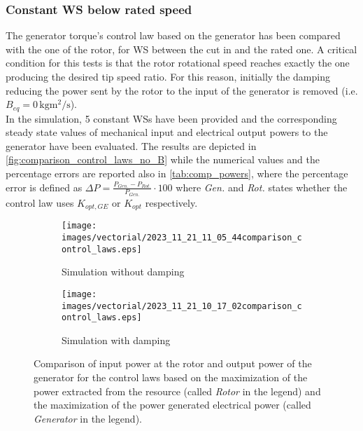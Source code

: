 \subsubsection{Constant WS below rated speed}
The generator torque's control law based on the generator has been compared with the one of the rotor, for WS between the cut in and the rated one. A critical condition for this tests is that the rotor rotational speed reaches exactly the one producing the desired tip speed ratio. For this reason, initially the damping reducing the power sent by the rotor to the input of the generator is removed (i.e. $B_{eq}=0 \, \si{\kilo\gram\square\meter\per\second}$). \\
In the simulation, 5 constant WSs have been provided and the corresponding steady state values of mechanical input and electrical output powers to the generator have been evaluated. The results are depicted in \autoref{fig:comparison_control_laws_no_B} while the numerical values and the percentage errors are reported also in \autoref{tab:comp_powers}, where the percentage error is defined as $\Delta P = \frac{P_{Gen.} - P_{Rot.}}{P_{Gen.}}\cdot 100$ where  \textit{Gen.} and \textit{Rot.} states whether the control law uses $K_{opt,GE}$ or $K_{opt}$ respectively.

\begin{figure}[htb]
  \centering
  \begin{subfigure}{\columnwidth}
    \texttt{[image: images/vectorial/2023\_11\_21\_11\_05\_44comparison\_control\_laws.eps]}
    \caption{Simulation without damping}
    \label{fig:comparison_control_laws_no_B}
  \end{subfigure}
  \begin{subfigure}{\columnwidth}
    \texttt{[image: images/vectorial/2023\_11\_21\_10\_17\_02comparison\_control\_laws.eps]}
    \caption{Simulation with damping}
    \label{fig:comparison_control_laws_B}
  \end{subfigure}
  \caption{Comparison of input power at the rotor and output power of the generator for the control laws based on the maximization of the power extracted from the resource (called \textit{Rotor} in the legend) and the maximization of the power generated electrical power (called \textit{Generator} in the legend).}
  \label{fig:comparison_control_laws}
\end{figure}

